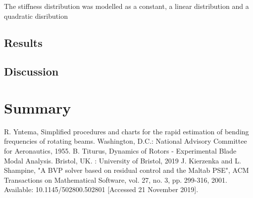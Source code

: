 \documentclass[11pt]{article}
\begin{document}



The stiffness distribution was modelled as a constant, a linear distribution and a quadratic disribution
\subsection{Results}
\subsection{Discussion}

\section{Summary}






\begin{thebibliography}{}
R. Yntema, Simplified procedures and charts for the rapid estimation of bending frequencies of rotating beams. Washington, D.C.: National Advisory Committee for Aeronautics, 1955.
B. Titurus, Dynamics of Rotors - Experimental Blade Modal Analysis. Bristol, UK. : University of Bristol, 2019
J. Kierzenka and L. Shampine, "A BVP solver based on residual control and the Maltab PSE", ACM Transactions on Mathematical Software, vol. 27, no. 3, pp. 299-316, 2001. Available: 10.1145/502800.502801 [Accessed 21 November 2019].
\end{thebibliography}{}
\appendix
\renewcommand\thefigure{A.\arabic{figure}}  
\setcounter{figure}{0}
\end{document}
